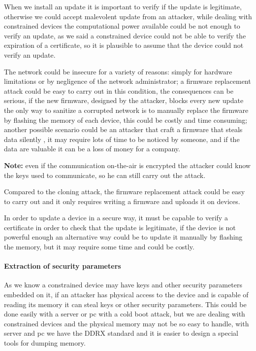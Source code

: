 	When we install an update it is important to verify if the update is legitimate, otherwise we could accept malevolent update from an attacker, while dealing with constrained devices the computational power available could be not enough to verify an update, as we said a constrained device could not be able to verify the expiration of a certificate, so it is plausible to assume that the device could not verify an update.\newline
	
	The network could be insecure for a variety of reasons: simply for hardware limitations or by negligence of the network administrator; a firmware replacement attack could be easy to carry out in this condition, the consequences can be serious, if the new firmware, designed by the attacker, blocks every new update the only way to sanitize a corrupted network is to manually replace the firmware by flashing the memory of each device, this could be costly and time consuming; another possible scenario could be an attacker that craft a firmware that steals data silently , it may require lots of time to be noticed by someone, and if the data are valuable it can be a loss of money for a company.\newline
	
	\textbf{Note:} even if the communication on-the-air is encrypted the attacker could know the keys used to communicate, so he can still carry out the attack.\newline
	
	Compared to the cloning attack, the firmware replacement attack could be easy to carry out and it only requires writing a firmware and uploads it on devices.\newline
	
	In order to update a device in a secure way, it must be capable to verify a certificate in order to check that the update is legitimate, if the device is not powerful enough an alternative way could be to update it manually by flashing the memory, but it may require some time and could be costly.\newline
	
	\paragraph{Extraction of security parameters}
	As we know a constrained device may have keys and other security parameters embedded on it, if an attacker has physical access to the device and is capable of reading its memory it can steal keys or other security parameters.\newline
	This could be done easily with a server or pc with a cold boot attack, but we are dealing with constrained devices and the physical memory may not be so easy to handle, with server and pc we have the DDRX standard and it is easier to design a special tools for dumping memory.\newline
	
